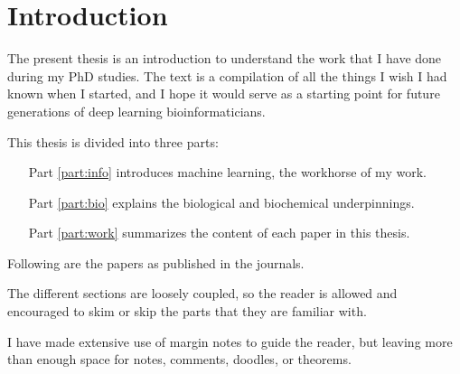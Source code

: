 \chapter{Introduction}

The present thesis is an introduction to understand the work that I have done during my PhD studies.
The text is a compilation of all the things I wish I had known when I started, and I hope it would serve as a starting point for future generations of deep learning bioinformaticians.

This thesis is divided into three parts:

\begin{itemize}
	\item[Part \ref{part:info}] introduces machine learning, the workhorse of my work.
	\item[Part \ref{part:bio}] explains the biological and biochemical underpinnings.
	\item[Part \ref{part:work}] summarizes the content of each paper in this thesis.
\end{itemize}

Following are the papers as published in the journals.

The different sections are loosely coupled, so the reader is allowed and encouraged to skim or skip the parts that they are familiar with.

I have made extensive use of margin notes to guide the reader, but leaving more than enough space for notes, comments, doodles, or theorems.

